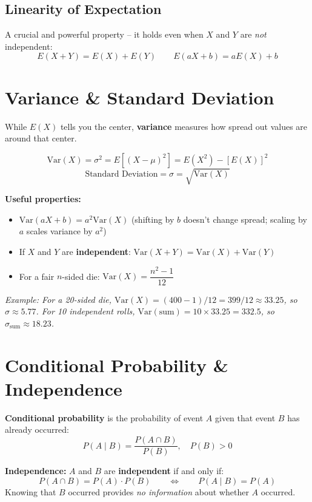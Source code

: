 \documentclass[11pt, letterpaper]{article}
\begin{document}
\subsection*{Linearity of Expectation}
A crucial and powerful property -- it holds even when $X$ and $Y$ are \emph{not} independent:
\[
  E(X + Y) = E(X) + E(Y) \qquad E(aX + b) = aE(X) + b
\]

\section*{Variance \& Standard Deviation}

While $E(X)$ tells you the center, \textbf{variance} measures how spread out values are around that center.

\[
  \text{Var}(X) = \sigma^2 = E\!\left[(X - \mu)^2\right] = E(X^2) - [E(X)]^2
\]
\[
  \text{Standard Deviation} = \sigma = \sqrt{\text{Var}(X)}
\]

\textbf{Useful properties:}
\begin{itemize}[noitemsep]
  \item $\text{Var}(aX + b) = a^2 \text{Var}(X)$ \quad (shifting by $b$ doesn't change spread; scaling by $a$ scales variance by $a^2$)
  \item If $X$ and $Y$ are \textbf{independent}: $\text{Var}(X + Y) = \text{Var}(X) + \text{Var}(Y)$
  \item For a fair $n$-sided die: $\text{Var}(X) = \dfrac{n^2 - 1}{12}$
\end{itemize}

\textit{Example: For a 20-sided die, $\text{Var}(X) = (400 - 1)/12 = 399/12 \approx 33.25$, so $\sigma \approx 5.77$. For 10 independent rolls, $\text{Var}(\text{sum}) = 10 \times 33.25 = 332.5$, so $\sigma_{\text{sum}} \approx 18.23$.}

\section*{Conditional Probability \& Independence}

\textbf{Conditional probability} is the probability of event $A$ given that event $B$ has already occurred:
\[
  P(A \mid B) = \frac{P(A \cap B)}{P(B)}, \quad P(B) > 0
\]

\textbf{Independence:} $A$ and $B$ are \textbf{independent} if and only if:
\[
  P(A \cap B) = P(A) \cdot P(B) \qquad \Longleftrightarrow \qquad P(A \mid B) = P(A)
\]
Knowing that $B$ occurred provides \emph{no information} about whether $A$ occurred.
\end{document}
